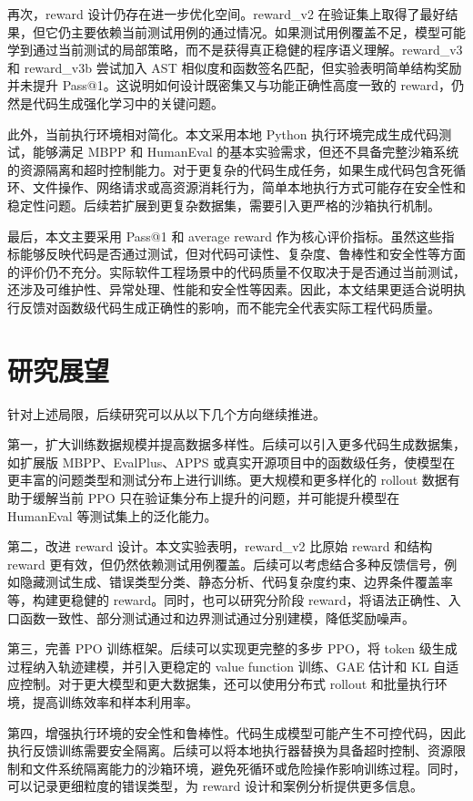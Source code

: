 再次，reward 设计仍存在进一步优化空间。reward\_v2 在验证集上取得了最好结果，但它仍主要依赖当前测试用例的通过情况。如果测试用例覆盖不足，模型可能学到通过当前测试的局部策略，而不是获得真正稳健的程序语义理解。reward\_v3 和 reward\_v3b 尝试加入 AST 相似度和函数签名匹配，但实验表明简单结构奖励并未提升 Pass@1。这说明如何设计既密集又与功能正确性高度一致的 reward，仍然是代码生成强化学习中的关键问题。

此外，当前执行环境相对简化。本文采用本地 Python 执行环境完成生成代码测试，能够满足 MBPP 和 HumanEval 的基本实验需求，但还不具备完整沙箱系统的资源隔离和超时控制能力。对于更复杂的代码生成任务，如果生成代码包含死循环、文件操作、网络请求或高资源消耗行为，简单本地执行方式可能存在安全性和稳定性问题。后续若扩展到更复杂数据集，需要引入更严格的沙箱执行机制。

最后，本文主要采用 Pass@1 和 average reward 作为核心评价指标。虽然这些指标能够反映代码是否通过测试，但对代码可读性、复杂度、鲁棒性和安全性等方面的评价仍不充分。实际软件工程场景中的代码质量不仅取决于是否通过当前测试，还涉及可维护性、异常处理、性能和安全性等因素。因此，本文结果更适合说明执行反馈对函数级代码生成正确性的影响，而不能完全代表实际工程代码质量。

\section{研究展望}

针对上述局限，后续研究可以从以下几个方向继续推进。

第一，扩大训练数据规模并提高数据多样性。后续可以引入更多代码生成数据集，如扩展版 MBPP、EvalPlus、APPS 或真实开源项目中的函数级任务，使模型在更丰富的问题类型和测试分布上进行训练。更大规模和更多样化的 rollout 数据有助于缓解当前 PPO 只在验证集分布上提升的问题，并可能提升模型在 HumanEval 等测试集上的泛化能力。

第二，改进 reward 设计。本文实验表明，reward\_v2 比原始 reward 和结构 reward 更有效，但仍然依赖测试用例覆盖。后续可以考虑结合多种反馈信号，例如隐藏测试生成、错误类型分类、静态分析、代码复杂度约束、边界条件覆盖率等，构建更稳健的 reward。同时，也可以研究分阶段 reward，将语法正确性、入口函数一致性、部分测试通过和边界测试通过分别建模，降低奖励噪声。

第三，完善 PPO 训练框架。后续可以实现更完整的多步 PPO，将 token 级生成过程纳入轨迹建模，并引入更稳定的 value function 训练、GAE 估计和 KL 自适应控制。对于更大模型和更大数据集，还可以使用分布式 rollout 和批量执行环境，提高训练效率和样本利用率。

第四，增强执行环境的安全性和鲁棒性。代码生成模型可能产生不可控代码，因此执行反馈训练需要安全隔离。后续可以将本地执行器替换为具备超时控制、资源限制和文件系统隔离能力的沙箱环境，避免死循环或危险操作影响训练过程。同时，可以记录更细粒度的错误类型，为 reward 设计和案例分析提供更多信息。

